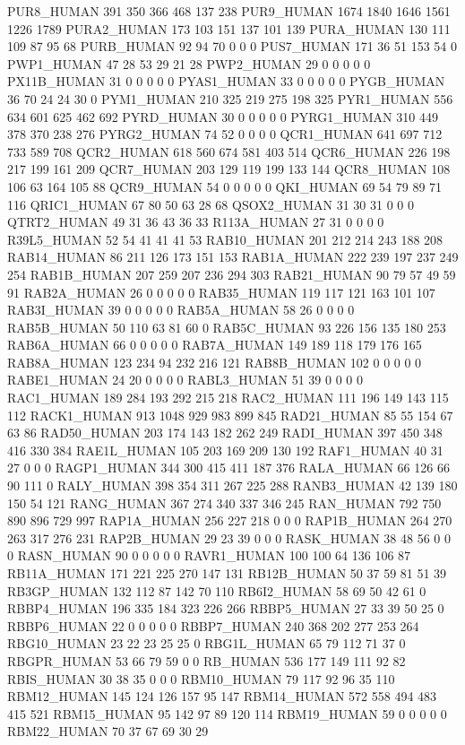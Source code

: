 PUR8_HUMAN	391	350	366	468	137	238
PUR9_HUMAN	1674	1840	1646	1561	1226	1789
PURA2_HUMAN	173	103	151	137	101	139
PURA_HUMAN	130	111	109	87	95	68
PURB_HUMAN	92	94	70	0	0	0
PUS7_HUMAN	171	36	51	153	54	0
PWP1_HUMAN	47	28	53	29	21	28
PWP2_HUMAN	29	0	0	0	0	0
PX11B_HUMAN	31	0	0	0	0	0
PYAS1_HUMAN	33	0	0	0	0	0
PYGB_HUMAN	36	70	24	24	30	0
PYM1_HUMAN	210	325	219	275	198	325
PYR1_HUMAN	556	634	601	625	462	692
PYRD_HUMAN	30	0	0	0	0	0
PYRG1_HUMAN	310	449	378	370	238	276
PYRG2_HUMAN	74	52	0	0	0	0
QCR1_HUMAN	641	697	712	733	589	708
QCR2_HUMAN	618	560	674	581	403	514
QCR6_HUMAN	226	198	217	199	161	209
QCR7_HUMAN	203	129	119	199	133	144
QCR8_HUMAN	108	106	63	164	105	88
QCR9_HUMAN	54	0	0	0	0	0
QKI_HUMAN	69	54	79	89	71	116
QRIC1_HUMAN	67	80	50	63	28	68
QSOX2_HUMAN	31	30	31	0	0	0
QTRT2_HUMAN	49	31	36	43	36	33
R113A_HUMAN	27	31	0	0	0	0
R39L5_HUMAN	52	54	41	41	41	53
RAB10_HUMAN	201	212	214	243	188	208
RAB14_HUMAN	86	211	126	173	151	153
RAB1A_HUMAN	222	239	197	237	249	254
RAB1B_HUMAN	207	259	207	236	294	303
RAB21_HUMAN	90	79	57	49	59	91
RAB2A_HUMAN	26	0	0	0	0	0
RAB35_HUMAN	119	117	121	163	101	107
RAB3I_HUMAN	39	0	0	0	0	0
RAB5A_HUMAN	58	26	0	0	0	0
RAB5B_HUMAN	50	110	63	81	60	0
RAB5C_HUMAN	93	226	156	135	180	253
RAB6A_HUMAN	66	0	0	0	0	0
RAB7A_HUMAN	149	189	118	179	176	165
RAB8A_HUMAN	123	234	94	232	216	121
RAB8B_HUMAN	102	0	0	0	0	0
RABE1_HUMAN	24	20	0	0	0	0
RABL3_HUMAN	51	39	0	0	0	0
RAC1_HUMAN	189	284	193	292	215	218
RAC2_HUMAN	111	196	149	143	115	112
RACK1_HUMAN	913	1048	929	983	899	845
RAD21_HUMAN	85	55	154	67	63	86
RAD50_HUMAN	203	174	143	182	262	249
RADI_HUMAN	397	450	348	416	330	384
RAE1L_HUMAN	105	203	169	209	130	192
RAF1_HUMAN	40	31	27	0	0	0
RAGP1_HUMAN	344	300	415	411	187	376
RALA_HUMAN	66	126	66	90	111	0
RALY_HUMAN	398	354	311	267	225	288
RANB3_HUMAN	42	139	180	150	54	121
RANG_HUMAN	367	274	340	337	346	245
RAN_HUMAN	792	750	890	896	729	997
RAP1A_HUMAN	256	227	218	0	0	0
RAP1B_HUMAN	264	270	263	317	276	231
RAP2B_HUMAN	29	23	39	0	0	0
RASK_HUMAN	38	48	56	0	0	0
RASN_HUMAN	90	0	0	0	0	0
RAVR1_HUMAN	100	100	64	136	106	87
RB11A_HUMAN	171	221	225	270	147	131
RB12B_HUMAN	50	37	59	81	51	39
RB3GP_HUMAN	132	112	87	142	70	110
RB6I2_HUMAN	58	69	50	42	61	0
RBBP4_HUMAN	196	335	184	323	226	266
RBBP5_HUMAN	27	33	39	50	25	0
RBBP6_HUMAN	22	0	0	0	0	0
RBBP7_HUMAN	240	368	202	277	253	264
RBG10_HUMAN	23	22	23	25	25	0
RBG1L_HUMAN	65	79	112	71	37	0
RBGPR_HUMAN	53	66	79	59	0	0
RB_HUMAN	536	177	149	111	92	82
RBIS_HUMAN	30	38	35	0	0	0
RBM10_HUMAN	79	117	92	96	35	110
RBM12_HUMAN	145	124	126	157	95	147
RBM14_HUMAN	572	558	494	483	415	521
RBM15_HUMAN	95	142	97	89	120	114
RBM19_HUMAN	59	0	0	0	0	0
RBM22_HUMAN	70	37	67	69	30	29
